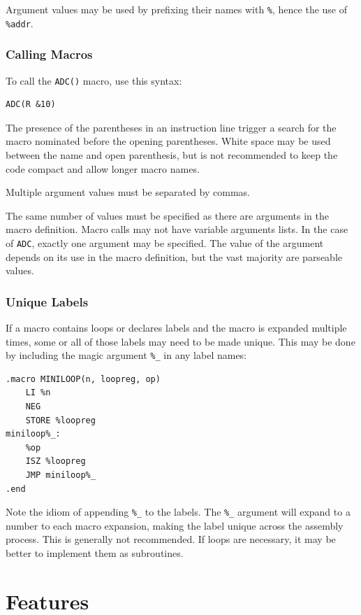 \documentclass[11pt,a4paper,twocolumns]{article}
\newcommand\f[1]{{\color{black}\texttt{#1}}}
\begin{document}
Argument values may be used by prefixing their names with \f{\%}, hence the use
of \f{\%addr}.

\subsubsection{Calling Macros}

To call the \f{ADC()} macro, use this syntax:

\begin{verbatim}
ADC(R &10)
\end{verbatim}

The presence of the parentheses in an instruction line trigger a search for the
macro nominated before the opening parentheses. White space may be used between
the name and open parenthesis, but is not recommended to keep the code compact
and allow longer macro names.

Multiple argument values must be separated by commas.

The same number of values must be specified as there are arguments in the macro
definition. Macro calls may not have variable arguments lists. In the case of
\f{ADC}, exactly one argument may be specified. The value of the argument
depends on its use in the macro definition, but the vast majority are parseable
values.

\subsubsection{Unique Labels}

If a macro contains loops or declares labels and the macro is expanded multiple
times, some or all of those labels may need to be made unique. This may be done
by including the magic argument \f{\%\_} in any label names:

\begin{verbatim}
.macro MINILOOP(n, loopreg, op)
    LI %n
    NEG
    STORE %loopreg
miniloop%_:
    %op
    ISZ %loopreg
    JMP miniloop%_
.end
\end{verbatim}

Note the idiom of appending \f{\%\_} to the labels. The \f{\%\_} argument will
expand to a number to each macro expansion, making the label unique across the
assembly process. This is generally not recommended. If loops are necessary, it
may be better to implement them as subroutines.


\section{Features}
\end{document}
